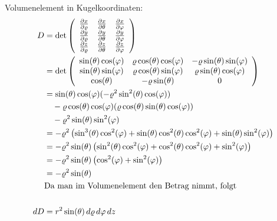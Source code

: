 \documentclass[a4paper,10pt]{extarticle}
\begin{document}
  Volumenelement in Kugelkoordinaten:
  \begin{align*}
  D &= \det \left(\begin{array}{c c c}
    \pdv{x}{\varrho} & \pdv{x}{\theta} & \pdv{x}{\varphi} \\
    \pdv{y}{\varrho} & \pdv{y}{\theta} & \pdv{y}{\varphi} \\
    \pdv{z}{\varrho} & \pdv{z}{\theta} & \pdv{z}{\varphi} \\
  \end{array}\right) \\
  &= \det \left(\begin{array}{c c c}
    \sin(\theta)\cos(\varphi) & \varrho \cos(\theta) \cos(\varphi) & - \varrho \sin(\theta) \sin(\varphi) \\
    \sin(\theta) \sin(\varphi) & \varrho \cos(\theta) \sin(\varphi) & \varrho \sin(\theta) \cos(\varphi) \\
    \cos(\theta) & - \varrho \sin(\theta) & 0 \\
  \end{array}\right) \\
  &= \sin(\theta) \cos(\varphi) (- \varrho^2 \sin^2(\theta) \cos(\varphi)) \\
  & \quad - \varrho \cos(\theta) \cos(\varphi) (\varrho \cos(\theta) \sin(\theta) \cos(\varphi)) \\ 
  & \quad - \varrho^2 \sin(\theta) \sin^2(\varphi) \\
  &= - \varrho^2 \left(\sin^3(\theta) \cos^2(\varphi) + \sin(\theta) \cos^2(\theta) \cos^2(\varphi) + \sin(\theta) \sin^2(\varphi)\right) \\ 
  &= - \varrho^2 \sin(\theta) \left( \sin^2(\theta) \cos^2(\varphi) + \cos^2(\theta) \cos^2(\varphi) + \sin^2(\varphi) \right) \\
  &= - \varrho^2 \sin(\theta) \left( \cos^2(\varphi) + \sin^2(\varphi) \right) \\
  &= - \varrho^2 \sin(\theta) \\
  &\mbox{Da man im Volumenelement den Betrag nimmt, folgt} \\ \\
  dD &= r^2 \sin(\theta) \,d\varrho \, d\varphi \, dz
  \end{align*}
\end{document}

